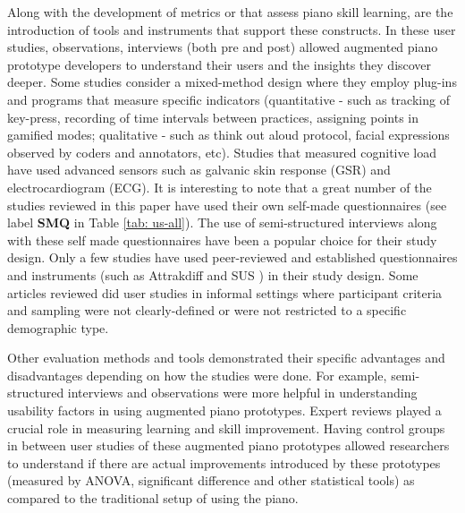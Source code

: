 \documentclass[sigconf, screen, review]{acmart}
\begin{document}
Along with the development of metrics or that assess piano skill learning, are the introduction of tools and instruments that support these constructs. In these user studies, observations, interviews (both pre and post) allowed augmented piano prototype developers to understand their users and the insights they discover deeper. Some studies consider a mixed-method design where they employ plug-ins and programs that measure specific indicators (quantitative - such as tracking of key-press, recording of time intervals between practices, assigning points in gamified modes; qualitative - such as think out aloud protocol, facial expressions observed by coders and annotators, etc). Studies that measured cognitive load have used advanced sensors such as galvanic skin response (GSR) and electrocardiogram (ECG). It is interesting to note that a great number of the studies reviewed in this paper have used their own self-made questionnaires (see label \textbf{SMQ} in Table \ref{tab: us-all}). The use of semi-structured interviews along with these self made questionnaires have been a popular choice for their study design. Only a few studies have used peer-reviewed and established questionnaires and instruments (such as Attrakdiff \cite{hassenzahl2003attrakdiff} and SUS \cite{lewis2009factor})  in their study design. Some articles reviewed did user studies in informal settings where participant criteria and sampling were not clearly-defined or were not restricted to a specific demographic type. 

Other evaluation methods and tools demonstrated their specific advantages and disadvantages depending on how the studies were done. For example, semi-structured interviews and observations were more helpful in understanding usability factors in using augmented piano prototypes. Expert reviews played a crucial role in measuring learning and skill improvement. Having control groups in between user studies of these augmented piano prototypes allowed researchers to understand if there are actual improvements introduced by these prototypes (measured by ANOVA, significant difference and other statistical tools) as compared to the traditional setup of using the piano. 



\end{document}
